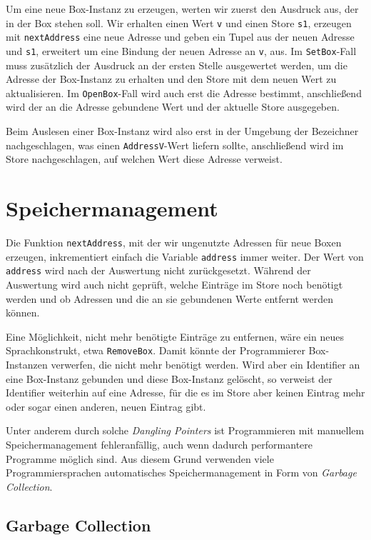 \documentclass[]{article}
\begin{document}
Um eine neue Box-Instanz zu erzeugen, werten wir zuerst den Ausdruck
aus, der in der Box stehen soll. Wir erhalten einen Wert \texttt{v} und
einen Store \texttt{s1}, erzeugen mit \texttt{nextAddress} eine neue
Adresse und geben ein Tupel aus der neuen Adresse und \texttt{s1},
erweitert um eine Bindung der neuen Adresse an \texttt{v}, aus. Im
\texttt{SetBox}-Fall muss zusätzlich der Ausdruck an der ersten Stelle
ausgewertet werden, um die Adresse der Box-Instanz zu erhalten und den
Store mit dem neuen Wert zu aktualisieren. Im \texttt{OpenBox}-Fall wird
auch erst die Adresse bestimmt, anschließend wird der an die Adresse
gebundene Wert und der aktuelle Store ausgegeben.

Beim Auslesen einer Box-Instanz wird also erst in der Umgebung der
Bezeichner nachgeschlagen, was einen \texttt{AddressV}-Wert liefern
sollte, anschließend wird im Store nachgeschlagen, auf welchen Wert
diese Adresse verweist.

\hypertarget{speichermanagement}{%
\section{Speichermanagement}\label{speichermanagement}}

Die Funktion \texttt{nextAddress}, mit der wir ungenutzte Adressen für
neue Boxen erzeugen, inkrementiert einfach die Variable \texttt{address}
immer weiter. Der Wert von \texttt{address} wird nach der Auswertung
nicht zurückgesetzt. Während der Auswertung wird auch nicht geprüft,
welche Einträge im Store noch benötigt werden und ob Adressen und die an
sie gebundenen Werte entfernt werden können.

Eine Möglichkeit, nicht mehr benötigte Einträge zu entfernen, wäre ein
neues Sprachkonstrukt, etwa \texttt{RemoveBox}. Damit könnte der
Programmierer Box-Instanzen verwerfen, die nicht mehr benötigt werden.
Wird aber ein Identifier an eine Box-Instanz gebunden und diese
Box-Instanz gelöscht, so verweist der Identifier weiterhin auf eine
Adresse, für die es im Store aber keinen Eintrag mehr oder sogar einen
anderen, neuen Eintrag gibt.

Unter anderem durch solche \emph{Dangling Pointers} ist Programmieren
mit manuellem Speichermanagement fehleranfällig, auch wenn dadurch
performantere Programme möglich sind. Aus diesem Grund verwenden viele
Programmiersprachen automatisches Speichermanagement in Form von
\emph{Garbage Collection}.

\hypertarget{garbage-collection}{%
\subsection{Garbage Collection}\label{garbage-collection}}
\end{document}

